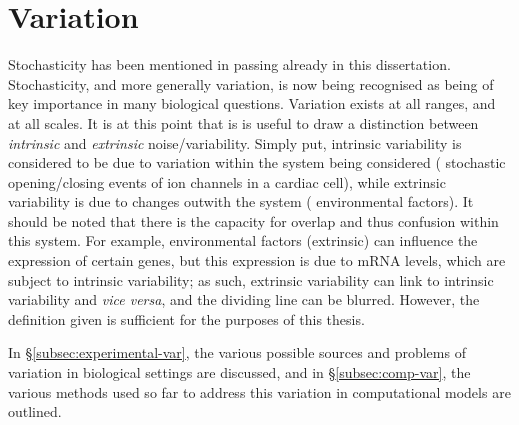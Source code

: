 \documentclass[../thesis-main.tex]{subfiles}
\begin{document}
 \section{Variation}
 \label{sec:param-var}
 Stochasticity has been mentioned in passing already in this dissertation. Stochasticity, and more generally variation, is now being recognised as being of key importance in many biological questions. Variation exists at all ranges, and at all scales. It is at this point that is is useful to draw a distinction between \emph{intrinsic} and \emph{extrinsic} noise/variability. Simply put, intrinsic variability is considered to be due to variation within the system being considered (\eg{} stochastic opening/closing events of ion channels in a cardiac cell), while extrinsic variability is due to changes outwith the system (\eg{} environmental factors). It should be noted that there is the capacity for overlap and thus confusion within this system. For example, environmental factors (extrinsic) can influence the expression of certain genes, but this expression is due to mRNA levels, which are subject to intrinsic variability; as such, extrinsic variability can link to intrinsic variability and \emph{vice versa}, and the dividing line can be blurred. However, the definition given is sufficient for the purposes of this thesis.
 
 
 
 In \S\ref{subsec:experimental-var}, the various possible sources and problems of variation in biological settings are discussed, and in \S\ref{subsec:comp-var}, the various methods used so far to address this variation in computational models are outlined.
 
\end{document}
